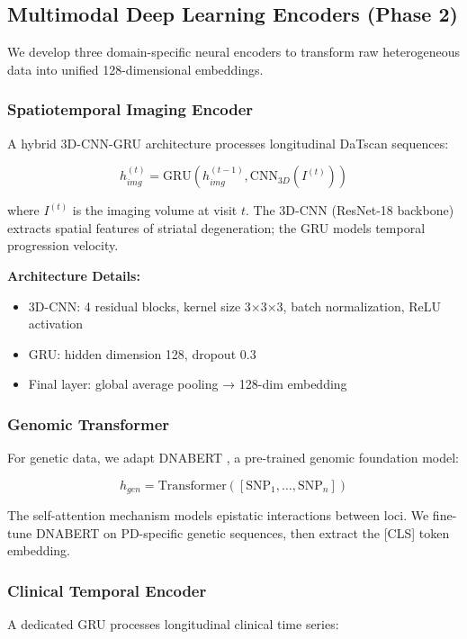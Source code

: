 \documentclass[conference]{IEEEtran}
\begin{document}
\subsection{Multimodal Deep Learning Encoders (Phase 2)}

We develop three domain-specific neural encoders to transform raw heterogeneous data into unified 128-dimensional embeddings.

\subsubsection{Spatiotemporal Imaging Encoder}
A hybrid 3D-CNN-GRU architecture processes longitudinal DaTscan sequences:

\begin{equation}
h_{img}^{(t)} = \text{GRU}(h_{img}^{(t-1)}, \text{CNN}_{3D}(I^{(t)}))
\end{equation}

where $I^{(t)}$ is the imaging volume at visit $t$. The 3D-CNN (ResNet-18 backbone) extracts spatial features of striatal degeneration; the GRU models temporal progression velocity.

\textbf{Architecture Details:}
\begin{itemize}
    \item 3D-CNN: 4 residual blocks, kernel size 3×3×3, batch normalization, ReLU activation
    \item GRU: hidden dimension 128, dropout 0.3
    \item Final layer: global average pooling → 128-dim embedding
\end{itemize}

\subsubsection{Genomic Transformer}
For genetic data, we adapt DNABERT \cite{ji2021dnabert}, a pre-trained genomic foundation model:

\begin{equation}
h_{gen} = \text{Transformer}([\text{SNP}_1, \ldots, \text{SNP}_n])
\end{equation}

The self-attention mechanism models epistatic interactions between loci. We fine-tune DNABERT on PD-specific genetic sequences, then extract the [CLS] token embedding.

\subsubsection{Clinical Temporal Encoder}
A dedicated GRU processes longitudinal clinical time series:
\end{document}
